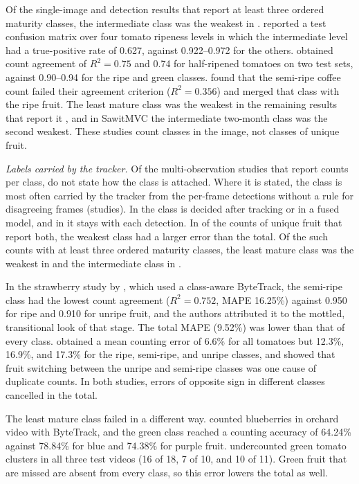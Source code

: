 Of the \nKelasLain single-image and detection results that report at least three ordered maturity classes, the intermediate class was the weakest in \nKelasLainTengah. \citet{pisharody2025precise} reported a test confusion matrix over four tomato ripeness levels in which the intermediate level had a true-positive rate of 0.627, against 0.922--0.972 for the others. \citet{rahim2021highly} obtained count agreement of $R^2=0.75$ and 0.74 for half-ripened tomatoes on two test sets, against 0.90--0.94 for the ripe and green classes. \citet{ramos2017automatic} found that the semi-ripe coffee count failed their agreement criterion ($R^2=0.356$) and merged that class with the ripe fruit. The least mature class was the weakest in the remaining results that report it \citep{ramos2018measurement,shrinivasacharya2026unified,indriani2026sawitmvc}, and in SawitMVC the intermediate two-month class was the second weakest. These studies count classes in the image, not classes of unique fruit.

\textit{Labels carried by the tracker.} Of the \nPerClass multi-observation studies that report counts per class, \nClassUnstated do not state how the class is attached. Where it is stated, the class is most often carried by the tracker from the per-frame detections without a rule for disagreeing frames (\nClassDuring studies). In \nClassAfter the class is decided after tracking or in a fused model, and in \nClassPerDet it stays with each detection. In \nKelasLebih of the \nKelasBanding counts of unique fruit that report both, the weakest class had a larger error than the total. Of the \nKelasUnik such counts with at least three ordered maturity classes, the least mature class was the weakest in \nKelasUnikMentah and the intermediate class in \nKelasUnikTengah.

In the strawberry study by \citet{ogundele2025real}, which used a class-aware ByteTrack, the semi-ripe class had the lowest count agreement ($R^2=0.752$, MAPE 16.25\%) against 0.950 for ripe and 0.910 for unripe fruit, and the authors attributed it to the mottled, transitional look of that stage. The total MAPE (9.52\%) was lower than that of every class. \citet{wang2025tomato} obtained a mean counting error of 6.6\% for all tomatoes but 12.3\%, 16.9\%, and 17.3\% for the ripe, semi-ripe, and unripe classes, and showed that fruit switching between the unripe and semi-ripe classes was one cause of duplicate counts. In both studies, errors of opposite sign in different classes cancelled in the total.

The least mature class failed in a different way. \citet{wu2025maturity} counted blueberries in orchard video with ByteTrack, and the green class reached a counting accuracy of 64.24\% against 78.84\% for blue and 74.38\% for purple fruit. \citet{tenorio2021automatic} undercounted green tomato clusters in all three test videos (16 of 18, 7 of 10, and 10 of 11). Green fruit that are missed are absent from every class, so this error lowers the total as well.

